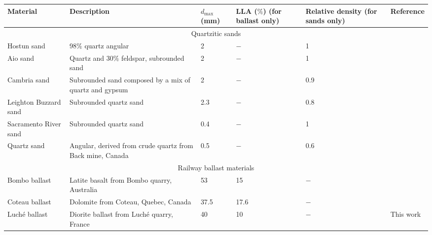 \begin{table}[htb]
    \centering
    \small
    \label{table:1}
    \tabcolsep=0.1mm
    \begin{tabular}{p{}<{\raggedright} p{}<{\raggedright} p{}<{\centering} p{}<{\centering} p{}<{\centering} p{}<{\raggedright}}
        \toprule
        Material & Description & $d_{\max}$ (mm) & LLA ($\%$) (for ballast only) & Relative density (for sands only) & Reference \\
        \midrule
        \multicolumn{6}{c}{Quartzitic sands} \\
        \midrule
        Hostun sand & 98$\%$ quartz angular & 2 & $-$ & 1 & \citet{Biarez19941} \\
        Aio sand& Quartz and 30$\%$ feldspar,  subrounded sand & 2 & $-$ & 1 & \citet{Nakata1999567} \\
        Cambria sand & Subrounded sand composed by a mix of quartz and gypsum & 2 & $-$ & 0.9 & \citet{Yamamuro1996109} \\
        Leighton Buzzard sand & Subrounded quartz sand & 2.3 & $-$ & 0.8 & \citet{Lee1992} \\
        Sacramento River sand & Subrounded quartz sand & 0.4 & $-$ & 1 & \citet{Lee1967117} \\
        Quartz sand & Angular, derived from crude quartz from Back mine, Canada & 0.5 & $-$ & 0.6 & \citet{Lo197361} \\
        \midrule
        \multicolumn{6}{c}{Railway ballast materials} \\
        \midrule
        Bombo ballast & Latite basalt from Bombo quarry, Australia & 53 & 15 & $-$ & \citet{Indraratna1998439} \\
        Coteau ballast & Dolomite from Coteau, Quebec, Canada & 37.5 & 17.6 & $-$ & \citet{Raymond1978737} \\
        Luché ballast & Diorite ballast from Luché quarry, France & 40 & 10 & $-$ & This work \\
        \bottomrule
    \end{tabular}
\end{table}